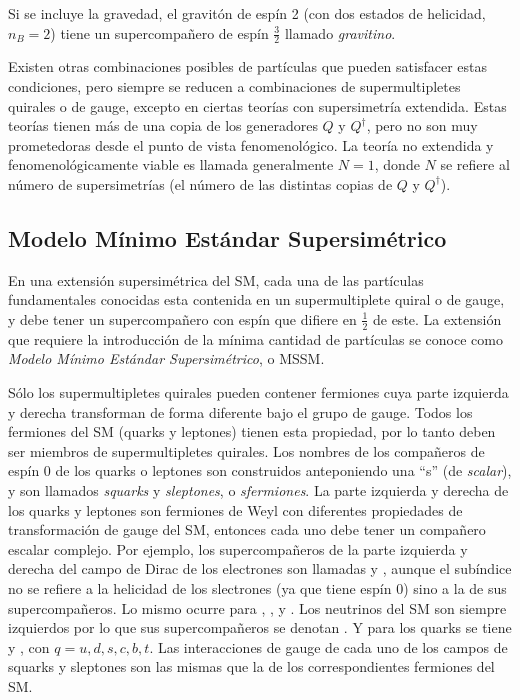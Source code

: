 Si se incluye la gravedad, el gravitón de espín 2 (con dos estados de helicidad,
$n_B=2$) tiene un supercompañero de espín $\frac{3}{2}$ llamado \emph{gravitino}.

Existen otras combinaciones posibles de partículas que pueden satisfacer estas
condiciones, pero siempre se reducen a combinaciones de supermultipletes
quirales o de gauge, excepto en ciertas teorías con supersimetría extendida.
Estas teorías tienen más de una copia de los generadores $Q$ y $Q^\dagger$, pero no
son muy prometedoras desde el punto de vista fenomenológico. La teoría no
extendida y fenomenológicamente viable es llamada generalmente $N=1$, donde $N$
se refiere al número de supersimetrías (el número de las distintas copias de
$Q$ y $Q^\dagger$).


\subsection{Modelo Mínimo Estándar Supersimétrico}

En una extensión supersimétrica del SM, cada una de las partículas fundamentales
conocidas esta contenida en un supermultiplete quiral o de gauge, y debe tener
un supercompa\~nero con espín que difiere en $\frac{1}{2}$ de este. La extensión que
requiere la introducción de la mínima cantidad de partículas se conoce como
\emph{Modelo Mínimo Estándar Supersimétrico}, o MSSM.


Sólo los supermultipletes quirales pueden contener fermiones cuya parte
izquierda y derecha transforman de forma diferente bajo el grupo de gauge. Todos
los fermiones del SM (quarks y leptones) tienen esta propiedad, por lo tanto
deben ser miembros de supermultipletes quirales. Los nombres de los compañeros
de espín 0 de los quarks o leptones son construidos anteponiendo una ``s'' (de
\emph{scalar}), y son llamados \emph{squarks} y \emph{sleptones}, o
\emph{sfermiones}. La parte izquierda y derecha de los quarks y leptones son
fermiones de Weyl con diferentes propiedades de transformación de gauge del SM,
entonces cada uno debe tener un compañero escalar complejo. Por ejemplo, los
supercompañeros de la parte izquierda y derecha del campo de Dirac de los
electrones son llamadas {\selL} y {\selR}, aunque el subíndice no se refiere a
la helicidad de los slectrones (ya que tiene espín 0) sino a la de sus supercompañeros.
Lo mismo ocurre para {\smuL}, {\smuR}, {\stauL} y {\stauR}. Los neutrinos del SM
son siempre izquierdos por lo que sus supercompañeros se denotan {\snu}. Y
para los quarks se tiene {\squarkL} y {\squarkR}, con $q = u, d, s, c, b, t$. Las
interacciones de gauge de cada uno de los campos de squarks y sleptones son las
mismas que la de los correspondientes fermiones del SM.

